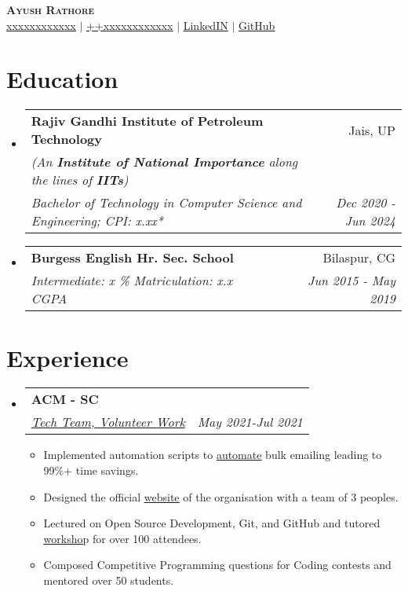 \documentclass[letterpaper,10pt]{article}
\makeatletter
\newcommand{\resumeItemWithoutTitle}[1]{
  \item\small{
  {#1 \vspace{-2pt}}
    {\vspace{-2pt}}
  }
}
\newcommand{\resumeSubheading}[4]{
  \vspace{-1pt}\item
    \begin{tabular*}{0.97\textwidth}{l@{\extracolsep{\fill}}r}
      \textbf{#1} & #2 \\
      \textit{\small#3} & \textit{\small #4} \\
    \end{tabular*}\vspace{-5pt}
}
\newcommand{\resumeSubheadingb}[6]{
  \vspace{-1pt}\item
    \begin{tabular*}{0.97\textwidth}{l@{\extracolsep{\fill}}r}
      \vspace{-3pt}
      \textbf{#1} & #2 \\
         \textit{\scriptsize(#3)} & \textit{\scriptsize #4} \\
      \textit{\small#5} & \textit{\small #6} \\
    \end{tabular*}\vspace{-5pt}
}
\newcommand{\resumeSubHeadingListStart}{\begin{itemize}[leftmargin=*]}
\newcommand{\resumeSubHeadingListEnd}{\end{itemize}}
\newcommand{\resumeItemListStart}{\begin{itemize}}
\newcommand{\resumeItemListEnd}{\end{itemize}\vspace{-5pt}}
\makeatother
\begin{document}
\begin{center}
    \textbf{\Huge \scshape Ayush Rathore} \\ \vspace{1pt}
     \href{mailto:xxxxxxxxxxxx}{\underline{xxxxxxxxxxxx}} $|$ 
  \small  \href{tel:++xxxxxxxxxxxx}{\underline{++xxxxxxxxxxxx}} $|$ 
    \href{https://linkedin.com/in/ayushr1}{\underline{LinkedIN}} $|$
    \href{https://github.com/ayushr1}{\underline{GitHub}}
\end{center}
\section{Education}
  \resumeSubHeadingListStart
    \resumeSubheadingb
      {Rajiv Gandhi Institute of Petroleum Technology}{Jais, UP}
     {An \textbf{Institute of National Importance} along the lines of \textbf{IITs}}{}
      {Bachelor of Technology in Computer Science and Engineering; CPI: x.xx*}{Dec 2020 - Jun 2024}
    \resumeSubheading
      {Burgess English Hr. Sec. School}{Bilaspur, CG}
      {Intermediate: x \%  Matriculation: x.x CGPA }{Jun 2015 - May 2019}
  \resumeSubHeadingListEnd
\section{Experience}
  \resumeSubHeadingListStart
    \resumeSubheading    
    {ACM - SC}{} {\href{https://drive.google.com/file/d/1KQhqLSIIQfqN3C1CQD_8H47HMY0nvCxV/view?usp=sharing}{{Tech Team, Volunteer Work}}}{May 2021-Jul 2021}
    \resumeItemListStart
        \resumeItemWithoutTitle
          {Implemented automation scripts to   \href{https://github.com/AyushR1/Bulk-Certificate-Maker/}{\underline{{automate}}} bulk emailing leading to 99\%+ time savings.}
        \resumeItemWithoutTitle
          {Designed the official     \href{https://rgipt.acm.org/}{\underline{{website}}} of the organisation with a team of 3 peoples.}
          \resumeItemWithoutTitle
                   {Lectured on {Open Source }Development, {Git}, and {GitHub} and tutored \href{ https://github.com/AyushR1/Git-GitHub-Workshop/}{\underline{worksho}}p for over 100 attendees.}
           \resumeItemWithoutTitle
      {Composed Competitive Programming questions for {Coding} contests and mentored over 50 students.}
      \resumeItemListEnd
\resumeSubHeadingListEnd
\end{document}
